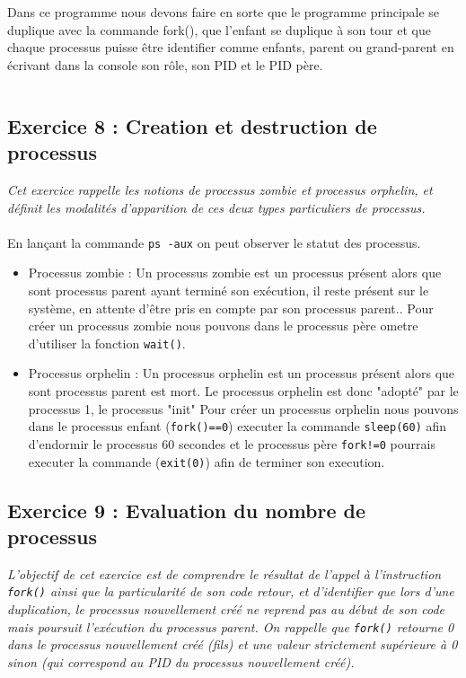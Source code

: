 \inputminted[linenos,firstline=9,lastline=27]{cpp}{../sources/cpp/TP5-6/ex7-fork1.c}

Dans ce programme nous devons faire en sorte que le programme principale se duplique avec la commande fork(), que l'enfant se duplique à son tour et que chaque processus puisse être identifier comme enfants, parent ou grand-parent en écrivant dans la console son rôle, son PID et le PID père.

\inputminted[linenos,firstline=9,lastline=30]{cpp}{../sources/cpp/TP5-6/ex7-fork2.c}

\subsection{Exercice 8 : Creation et destruction de processus}
\textit{Cet exercice rappelle les notions de processus zombie et processus orphelin, et définit les modalités d’apparition de ces deux types particuliers de processus.}
\\\\
En lançant la commande \texttt{ps -aux} on peut observer le statut des processus.

\begin{itemize}
  \item Processus zombie :
  Un processus zombie est un processus présent alors que sont processus parent ayant terminé son exécution, il reste présent sur le système, en attente d'être pris en compte par son processus parent..
  Pour créer un processus zombie nous pouvons dans le processus père ometre d'utiliser la fonction \texttt{wait()}.
  \item Processus orphelin :
  Un processus orphelin est un processus présent alors que sont processus parent est mort. Le processus orphelin est donc "adopté" par le processus 1, le processus "init"
  Pour créer un processus orphelin nous pouvons dans le processus enfant (\texttt{fork()==0}) executer la commande \texttt{sleep(60)} afin d'endormir le processus 60 secondes et le processus père \texttt{fork!=0} pourrais executer la commande (\texttt{exit(0)}) afin de terminer son execution.
\end{itemize}

\subsection{Exercice 9 : Evaluation du nombre de processus}
\textit{L’objectif de cet exercice est de comprendre le résultat de l’appel à l’instruction \texttt{fork()} ainsi que la particularité de son code retour, et d’identifier que lors d’une duplication, le processus nouvellement créé ne reprend pas au début de son code mais poursuit l’exécution du processus parent. On rappelle que \texttt{fork()} retourne 0 dans le processus nouvellement créé (fils) et une valeur strictement supérieure à 0 sinon (qui correspond au PID du processus nouvellement créé).}

